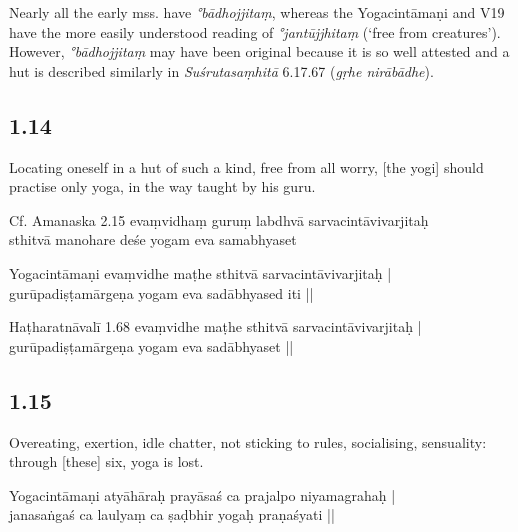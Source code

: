 \begin{ekdosis}
\begin{philcomm}[hp01_013]
Nearly all the early mss. have \emph{°bādhojjitaṃ}, whereas the Yogacintāmaṇi and V19 have the more easily understood reading of \emph{°jantūjjhitaṃ} (‘free from creatures’). However, \emph{°bādhojjitaṃ} may have been original because it is so well attested and a hut is described similarly in \emph{Suśrutasaṃhitā} 6.17.67 (\emph{gṛhe nirābādhe}).
\end{philcomm}

\subsection*{1.14}
\begin{translation}[hp01_014]
Locating oneself in a hut of such a kind, free from all worry, [the yogi] should practise only yoga, in the way taught by his guru.
\end{translation}

\begin{sources}[hp01_014]
Cf. Amanaska 2.15
\startverse
evaṃvidhaṃ guruṃ labdhvā sarvacintāvivarjitaḥ\\
sthitvā manohare deśe yogam eva samabhyaset
\endverse
\end{sources}

\begin{testimonia}[hp01_014]
Yogacintāmaṇi
\startverse
evaṃvidhe maṭhe sthitvā sarvacintāvivarjitaḥ |\\
gurūpadiṣṭamārgeṇa yogam eva sadābhyased iti ||
\endverse

Haṭharatnāvalī 1.68
\startverse
evaṃvidhe maṭhe sthitvā sarvacintāvivarjitaḥ |\\
gurūpadiṣṭamārgeṇa yogam eva sadābhyaset ||
\endverse
\end{testimonia}


\subsection*{1.15}
\begin{translation}[hp01_015]
Overeating, exertion, idle chatter, not sticking to rules, socialising, sensuality: through [these] six, yoga is lost.
\end{translation}

\begin{testimonia}[hp01_015]
Yogacintāmaṇi
\startverse
atyāhāraḥ prayāsaś ca prajalpo niyamagrahaḥ |\\
janasaṅgaś ca laulyaṃ ca ṣaḍbhir yogaḥ praṇaśyati ||
\endverse


\end{testimonia}
\end{ekdosis}
